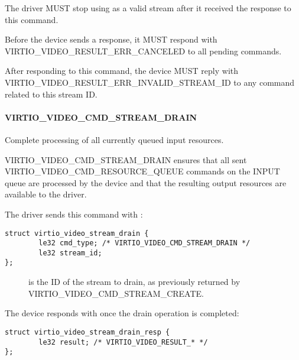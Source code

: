 The driver MUST stop using  as a valid stream after it
received the response to this command.


Before the device sends a response, it MUST respond with
VIRTIO\_VIDEO\_RESULT\_ERR\_CANCELED to all pending commands.

After responding to this command, the device MUST reply with
VIRTIO\_VIDEO\_RESULT\_ERR\_INVALID\_STREAM\_ID to any command related
to this stream ID.

\paragraph{VIRTIO_VIDEO_CMD_STREAM_DRAIN}\label{sec:Device Types / Video Device / Device Operation / Device Operation: Stream commands / VIRTIO_VIDEO_CMD_STREAM_DRAIN}

Complete processing of all currently queued input resources.

VIRTIO\_VIDEO\_CMD\_STREAM\_DRAIN ensures that all sent
VIRTIO\_VIDEO\_CMD\_RESOURCE\_QUEUE commands on the INPUT queue are
processed by the device and that the resulting output resources are
available to the driver.

The driver sends this command with
:

\begin{lstlisting}
struct virtio_video_stream_drain {
        le32 cmd_type; /* VIRTIO_VIDEO_CMD_STREAM_DRAIN */
        le32 stream_id;
};
\end{lstlisting}

\begin{description}
\item[]
is the ID of the stream to drain, as previously returned by
VIRTIO\_VIDEO\_CMD\_STREAM\_CREATE.
\end{description}

The device responds with 
once the drain operation is completed:

\begin{lstlisting}
struct virtio_video_stream_drain_resp {
        le32 result; /* VIRTIO_VIDEO_RESULT_* */
};
\end{lstlisting}

